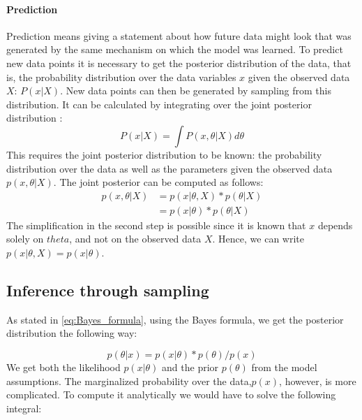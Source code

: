 \documentclass{article}
\begin{document}
\paragraph{Prediction}
Prediction means giving a statement about how future data might look that was generated by the same mechanism on which the model was learned. To predict new data points it is necessary to get the posterior distribution of the data, that is, the probability distribution over the data variables $x$ given the observed data $X$: $P(x|X)$. New data points can then be generated by sampling from this distribution. It can be calculated by integrating over the joint posterior distribution \cite{1439840954}:
\begin{equation}
P(x|X) = \int P(x,\theta|X) d\theta
\end{equation}
This requires the joint posterior distribution to be known: the probability distribution over the data as well as the parameters given the observed data $p(x,\theta|X)$. The joint posterior can be computed as follows:
\begin{equation}
\begin{aligned}
p(x,\theta|X) &	= p(x|\theta,X) * p(\theta|X) \\
 			& = p(x|\theta) * p(\theta|X)
\end{aligned}
\end{equation}
The simplification in the second step is possible since it is known that $x$ depends solely on $theta$, and not on the observed data $X$. Hence, we can write $p(x|\theta,X) = p(x|\theta)$.

\subsection{Inference through sampling}
\label{subsec:sampling}
As stated in \autoref{eq:Bayes_formula}, using the Bayes formula, we get the posterior distribution the following way:

\begin{equation}
p(\theta|x) = p(x|\theta) * p(\theta) / p(x)
\end{equation}
We get both the likelihood $p(x|\theta)$ and the prior $p(\theta)$ from the model assumptions. The marginalized probability over the data,$p(x)$, however, is more complicated. To compute it analytically we would have to solve the following integral:
\end{document}
